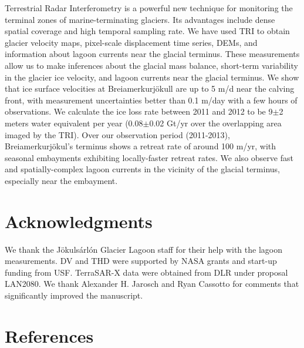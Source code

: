 Terrestrial Radar Interferometry is a powerful new technique for monitoring the terminal zones of marine-terminating glaciers. Its advantages include dense spatial coverage and high temporal sampling rate. We have used TRI to obtain glacier velocity maps, pixel-scale displacement time series, DEMs, and information about lagoon currents near the glacial terminus. These measurements allow us to make inferences about the glacial mass balance, short-term variability in the glacier ice velocity, and lagoon currents near the glacial terminus. We show that ice surface velocities at Brei{\dh}amerkurjökull are up to 5 m/d near the calving front, with measurement uncertainties better than 0.1 m/day  with a few hours of observations. We calculate the ice loss rate between 2011 and 2012 to be 9$\pm$2 meters water equivalent per year (0.08$\pm$0.02 Gt/yr over the overlapping area imaged by the TRI). Over our observation period (2011-2013), Brei{\dh}amerkurjökul's terminus shows a retreat rate of around 100 m/yr, with seasonal embayments exhibiting locally-faster retreat rates. We also observe fast and spatially-complex lagoon currents in the vicinity of the glacial terminus, especially near the embayment.

\section{Acknowledgments}
We thank the Jökulsárlón Glacier Lagoon staff for their help with the lagoon measurements. DV and THD were supported by NASA grants and start-up funding from USF. TerraSAR-X data were obtained from DLR under proposal LAN2080. We thank Alexander H. Jarosch and Ryan Cassotto for comments that significantly improved the manuscript.



\section{References}


